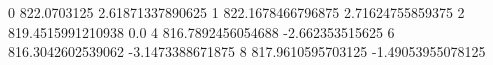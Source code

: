 0 822.0703125 2.61871337890625
1 822.1678466796875 2.71624755859375
2 819.4515991210938 0.0
4 816.7892456054688 -2.662353515625
6 816.3042602539062 -3.1473388671875
8 817.9610595703125 -1.49053955078125
